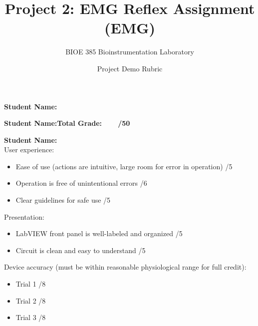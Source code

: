\documentclass{article}
\title{Project 2: EMG Reflex Assignment (EMG)}
\author{BIOE 385 Bioinstrumentation Laboratory}
\date{Project Demo Rubric}
\begin{document}
\large
\maketitle

\textbf{Student Name:}\vspace{0.5cm}

\textbf{Student Name:}\hfill 	\textbf{Total Grade:\ \ \ \ \underline{\hspace{1cm}}/50}\vspace{0.5cm}

\textbf{Student Name:}\hfill\\

User experience:
\begin{itemize}
	\item Ease of use (actions are intuitive, large room for error in operation) \hfill \underline{\hspace{1cm}}/5 \vspace{2cm}
	\item Operation is free of unintentional errors \hfill \underline{\hspace{1cm}}/6\vspace{2cm}
	\item Clear guidelines for safe use \hfill \underline{\hspace{1cm}}/5\vspace{1cm}
\end{itemize}

Presentation:
\begin{itemize}
	\item LabVIEW front panel is well-labeled and organized \hfill \underline{\hspace{1cm}}/5 \vspace{2cm}
	\item Circuit is clean and easy to understand \hfill \underline{\hspace{1cm}}/5 \vspace{2cm}
\end{itemize}


Device accuracy (must be within reasonable physiological range for full credit):
\begin{itemize}
	\item Trial 1 \underline{\hspace{3cm}} \hfill \underline{\hspace{1cm}}/8
	\item Trial 2 \underline{\hspace{3cm}} \hfill \underline{\hspace{1cm}}/8
	\item Trial 3 \underline{\hspace{3cm}} \hfill \underline{\hspace{1cm}}/8
\end{itemize}
\end{document}
